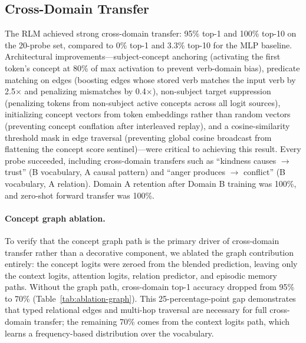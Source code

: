\documentclass[11pt]{article}
\begin{document}
\subsection{Cross-Domain Transfer}
The RLM achieved strong cross-domain transfer: 95\% top-1 and 100\% top-10 on the 20-probe set, compared to 0\% top-1 and 3.3\% top-10 for the MLP baseline. Architectural improvements---subject-concept anchoring (activating the first token's concept at 80\% of max activation to prevent verb-domain bias), predicate matching on edges (boosting edges whose stored verb matches the input verb by 2.5$\times$ and penalizing mismatches by 0.4$\times$), non-subject target suppression (penalizing tokens from non-subject active concepts across all logit sources), initializing concept vectors from token embeddings rather than random vectors (preventing concept conflation after interleaved replay), and a cosine-similarity threshold mask in edge traversal (preventing global cosine broadcast from flattening the concept score sentinel)---were critical to achieving this result. Every probe succeeded, including cross-domain transfers such as ``kindness causes $\to$ trust'' (B vocabulary, A causal pattern) and ``anger produces $\to$ conflict'' (B vocabulary, A relation). Domain A retention after Domain B training was 100\%, and zero-shot forward transfer was 100\%.

\paragraph{Concept graph ablation.}
To verify that the concept graph path is the primary driver of cross-domain transfer rather than a decorative component, we ablated the graph contribution entirely: the concept logits were zeroed from the blended prediction, leaving only the context logits, attention logits, relation predictor, and episodic memory paths. Without the graph path, cross-domain top-1 accuracy dropped from 95\% to 70\% (Table~\ref{tab:ablation-graph}). This 25-percentage-point gap demonstrates that typed relational edges and multi-hop traversal are necessary for full cross-domain transfer; the remaining 70\% comes from the context logits path, which learns a frequency-based distribution over the vocabulary.
\end{document}
